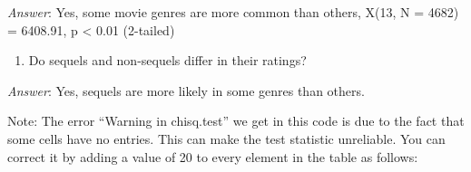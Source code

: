 \documentclass[]{book}
\newenvironment{Shaded}{\begin{snugshade}}{\end{snugshade}}
\newcommand{\KeywordTok}[1]{\textcolor[rgb]{0.13,0.29,0.53}{\textbf{#1}}}
\newcommand{\StringTok}[1]{\textcolor[rgb]{0.31,0.60,0.02}{#1}}
\newcommand{\OperatorTok}[1]{\textcolor[rgb]{0.81,0.36,0.00}{\textbf{#1}}}
\newcommand{\NormalTok}[1]{#1}
\providecommand{\tightlist}{%
  \setlength{\itemsep}{0pt}\setlength{\parskip}{0pt}}
\theoremstyle{definition}
\theoremstyle{definition}
\theoremstyle{remark}
\begin{document}
\emph{Answer}: Yes, some movie genres are more common than others, X(13,
N = 4682) = 6408.91, p \textless{} 0.01 (2-tailed)

\begin{enumerate}
\def\labelenumi{\arabic{enumi}.}
\setcounter{enumi}{5}
\tightlist
\item
  Do sequels and non-sequels differ in their ratings?
\end{enumerate}

\begin{Shaded}
\end{Shaded}

\emph{Answer}: Yes, sequels are more likely in some genres than others.

Note: The error ``Warning in chisq.test'' we get in this code is due to
the fact that some cells have no entries. This can make the test
statistic unreliable. You can correct it by adding a value of 20 to
every element in the table as follows:
\end{document}
